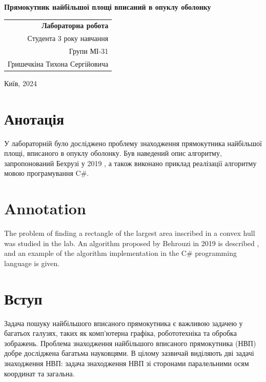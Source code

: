 \documentclass[a4paper,12pt]{article}
\begin{document}
	
	\begin{titlepage}
		\centering
		\vspace*{1cm}
		
		\huge\textbf{Прямокутник
			найбільшої площі
			вписаний в опуклу
			оболонку}
		
		\vspace{1.5cm}
		
		\raggedleft
		\large
		\begin{tabular}{r}
			\textbf{Лабораторна робота} \\
			Студента 3 року навчання \\
			Групи МІ-31 \\
			Гришечкіна Тихона Сергійовича \\
		\end{tabular}
		
		\vfill
		
		\centering
		\large
		Київ, 2024
		
	\end{titlepage}
	
	\tableofcontents
	\newpage
	
	\section*{Анотація}
	У лабораторній було досліджено проблему знаходження прямокутника найбільшої площі, вписаного в опуклу оболонку. Був наведений опис алгоритму, запропонований Бехрузі у 2019 \cite{example1}, а також виконано приклад реалізації алгоритму мовою програмування C\#.
	
	\section*{Annotation}
	The problem of finding a rectangle of the largest area inscribed in a convex hull was studied in the lab. An algorithm proposed by Behrouzi in 2019 is described \cite{example1}, and an example of the algorithm implementation in the C\# programming language is given.
	\newpage
	
	\section{Вступ}
		
		Задача пошуку найбільшого вписаного прямокутника є важливою задачею у багатьох галузях, таких як комп'ютерна графіка, робототехніка та обробка зображень. Проблема знаходження найбільшого вписаного прямокутника (НВП) добре досліджена багатьма науковцями. В цілому зазвичай виділяють дві задачі знаходження НВП: задача знаходження НВП зі сторонами паралельними осям координат та загальна.
		
\end{document}
